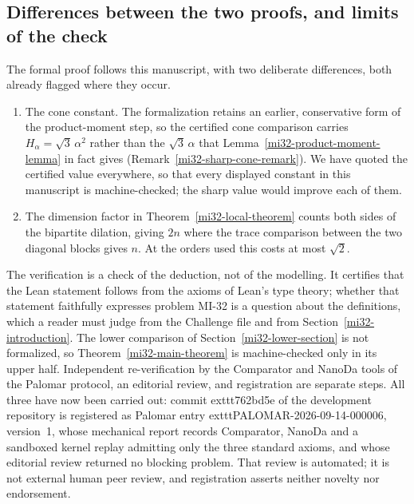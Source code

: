\documentclass[11pt]{article}
\theoremstyle{definition}
\theoremstyle{remark}
\begin{document}
\subsection{Differences between the two proofs, and limits of the check}

The formal proof follows this manuscript, with two deliberate
differences, both already flagged where they occur.

\begin{enumerate}
\item The cone constant. The formalization retains an earlier,
conservative form of the product-moment step, so the certified cone
comparison carries $H_\alpha=\sqrt3\,\alpha^2$ rather than the
$\sqrt3\,\alpha$ that Lemma~\ref{mi32-product-moment-lemma} in fact
gives (Remark~\ref{mi32-sharp-cone-remark}). We have quoted the
certified value everywhere, so that every displayed constant in this
manuscript is machine-checked; the sharp value would improve each of
them.
\item The dimension factor in Theorem~\ref{mi32-local-theorem} counts
both sides of the bipartite dilation, giving $2n$ where the trace
comparison between the two diagonal blocks gives $n$. At the orders
used this costs at most $\sqrt2$.
\end{enumerate}

The verification is a check of the deduction, not of the modelling.
It certifies that the Lean statement follows from the axioms of
Lean's type theory; whether that statement faithfully expresses
problem MI-32 is a question about the definitions, which a reader must
judge from the Challenge file and from
Section~\ref{mi32-introduction}. The lower comparison of
Section~\ref{mi32-lower-section} is not formalized, so
Theorem~\ref{mi32-main-theorem} is machine-checked only in its upper
half. Independent re-verification by the Comparator and NanoDa tools
of the Palomar protocol, an editorial review, and registration are
separate steps. All three have now been carried out: commit
	exttt{762bd5e} of the development repository is registered as Palomar
entry 	exttt{PALOMAR-2026-09-14-000006}, version~1, whose mechanical
report records Comparator, NanoDa and a sandboxed kernel replay
admitting only the three standard axioms, and whose editorial review
returned no blocking problem. That review is automated; it is not
external human peer review, and registration asserts neither novelty
nor endorsement.
\end{document}
